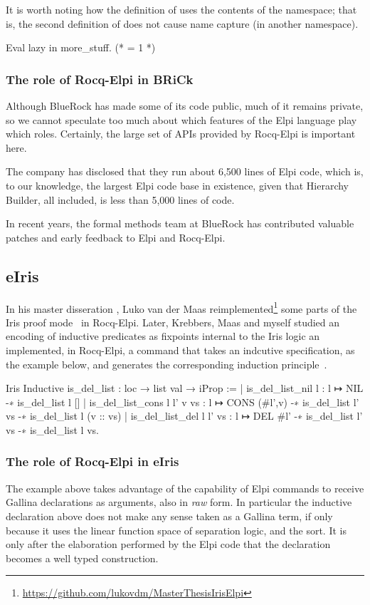 \documentclass{these-ISSS}
\newenvironment{rocqcode}
  {\VerbatimEnvironment\begin{rocqbox}\begin{xrocqcode}}{\end{xrocqcode}
\end{rocqbox}}
\begin{document}
It is worth noting how the definition of  uses the contents
of the namespace; that is, the second definition of  does not
cause name capture (in another namespace).

\begin{rocqcode}
Eval lazy in more_stuff. (* = 1 *)
\end{rocqcode}

\subsubsection{The role of Rocq-Elpi in BRiCk}

Although BlueRock has made some of its code public, much of it remains
private, so we cannot speculate too much about which features of the Elpi
language play which roles. Certainly, the large set of APIs provided by
Rocq-Elpi is important here.

The company has disclosed that they run about 6,500 lines of Elpi code, which
is, to our knowledge, the largest Elpi code base in existence, given that
Hierarchy Builder, all included, is less than 5,000 lines of code.

In recent years, the formal methods team at BlueRock has contributed valuable
patches and early feedback to Elpi and Rocq-Elpi.

\subsection{eIris}

In his master disseration \cite{Maas2024}, Luko van der Maas reimplemented\footnote{\url{https://github.com/lukovdm/MasterThesisIrisElpi}}
some parts of the Iris proof mode~\cite{10.1007/978-3-662-54434-1_26} in
Rocq-Elpi. Later, Krebbers, Maas and myself studied an encoding of inductive
predicates as fixpoints internal to the Iris logic an implemented,
in Rocq-Elpi, a command that takes an indcutive specification, as the example
below, and generates the corresponding induction principle~\cite{TODO}.

\begin{rocqcode}
Iris Inductive is_del_list : loc → list val → iProp :=
| is_del_list_nil l : l ↦ NIL -∗ is_del_list l []
| is_del_list_cons l l' v vs :
    l ↦ CONS (#l',v) -∗ is_del_list l' vs -∗ is_del_list l (v :: vs)
| is_del_list_del l l' vs :
    l ↦ DEL #l' -∗ is_del_list l' vs -∗ is_del_list l vs.
\end{rocqcode}

\subsubsection{The role of Rocq-Elpi in eIris}
The example above takes advantage of the capability of Elpi commands to
receive Gallina declarations as arguments, also in \emph{raw} form.
In particular the inductive declaration above does not make any sense
taken as a Gallina term, if only because it uses the linear function
space of separation logic, and the  sort.
It is only after the elaboration performed by
the Elpi code that the declaration becomes a well typed construction.
\end{document}
